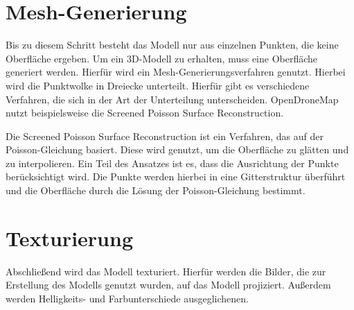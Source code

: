 \documentclass[./00PhotoBox.tex]{subfiles}
\begin{document}
\section{Mesh-Generierung}
Bis zu diesem Schritt besteht das Modell nur aus einzelnen Punkten, die keine Oberfläche ergeben. Um ein 3D-Modell zu erhalten, muss eine Oberfläche generiert werden. Hierfür wird ein Mesh-Generierungsverfahren genutzt. Hierbei wird die Punktwolke in Dreiecke unterteilt. Hierfür gibt es verschiedene Verfahren, die sich in der Art der Unterteilung unterscheiden. OpenDroneMap nutzt beispielsweise die Screened Poisson Surface Reconstruction. \citep[S. 52f]{opendronemap}

Die Screened Poisson Surface Reconstruction ist ein Verfahren, das auf der Poisson-Gleichung basiert. Diese wird genutzt, um die Oberfläche zu glätten und zu interpolieren. Ein Teil des Ansatzes ist es, dass die Ausrichtung der Punkte berücksichtigt wird. Die Punkte werden hierbei in eine Gitterstruktur überführt und die Oberfläche durch die Lösung der Poisson-Gleichung bestimmt. \citep{spsr}

\section{Texturierung}
Abschließend wird das Modell texturiert. Hierfür werden die Bilder, die zur Erstellung des Modells genutzt wurden, auf das Modell projiziert. Außerdem werden Helligkeits- und Farbunterschiede ausgeglichenen. \citep[S. 54f]{opendronemap}

\biblio
\end{document}
